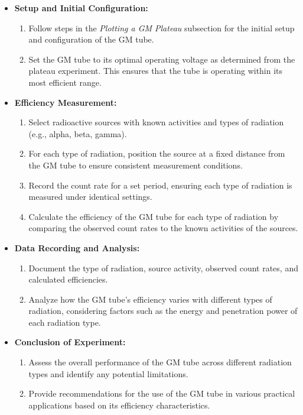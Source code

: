 \documentclass[11pt]{article}
\begin{document}
	\begin{itemize}
		\item \textbf{Setup and Initial Configuration:}
		\begin{enumerate}
			\item Follow steps in the \textit{Plotting a GM Plateau} subsection for the initial setup and configuration of the GM tube.
			\item Set the GM tube to its optimal operating voltage as determined from the plateau experiment. This ensures that the tube is operating within its most efficient range.
		\end{enumerate}
		
		\item \textbf{Efficiency Measurement:}
		\begin{enumerate}
			\item Select radioactive sources with known activities and types of radiation (e.g., alpha, beta, gamma).
			\item For each type of radiation, position the source at a fixed distance from the GM tube to ensure consistent measurement conditions.
			\item Record the count rate for a set period, ensuring each type of radiation is measured under identical settings.
			\item Calculate the efficiency of the GM tube for each type of radiation by comparing the observed count rates to the known activities of the sources.
		\end{enumerate}
		
		\item \textbf{Data Recording and Analysis:}
		\begin{enumerate}
			\item Document the type of radiation, source activity, observed count rates, and calculated efficiencies.
			\item Analyze how the GM tube's efficiency varies with different types of radiation, considering factors such as the energy and penetration power of each radiation type.
		\end{enumerate}
		
		\item \textbf{Conclusion of Experiment:}
		\begin{enumerate}
			\item Assess the overall performance of the GM tube across different radiation types and identify any potential limitations.
			\item Provide recommendations for the use of the GM tube in various practical applications based on its efficiency characteristics.
		\end{enumerate}
	\end{itemize}
	
\end{document}
